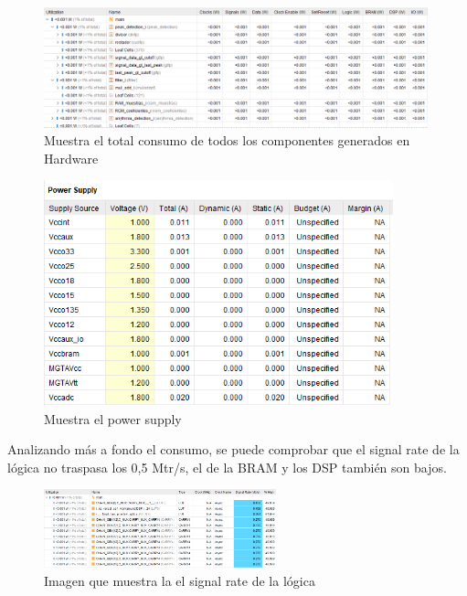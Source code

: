 	\begin{figure}[h!]
		\centering
		\includegraphics[width=0.99\textwidth]{./Images/img_res_experimentales/hierarchical.png}
		\caption{Muestra el total consumo de todos los componentes generados en Hardware}
		\label{fig:hierarchical}
	\end{figure} 

	\begin{figure}[h!]
		\centering
		\includegraphics[width=0.9\textwidth]{./Images/img_res_experimentales/powersupply.png}
		\caption{Muestra el power supply}
		\label{fig:powersupply}
	\end{figure} 
	\FloatBarrier

	Analizando más a fondo el consumo, se puede comprobar que el signal rate de la lógica no traspasa los 0,5 Mtr/s, el de la BRAM y los DSP también son bajos.
	
	\begin{figure}[h!]
		\centering
		\includegraphics[width=0.6\textwidth]{./Images/img_res_experimentales/signalratelogic.png}
		\caption{Imagen que muestra la el signal rate de la lógica}
		\label{fig:signalratelogic}
	\end{figure} 


